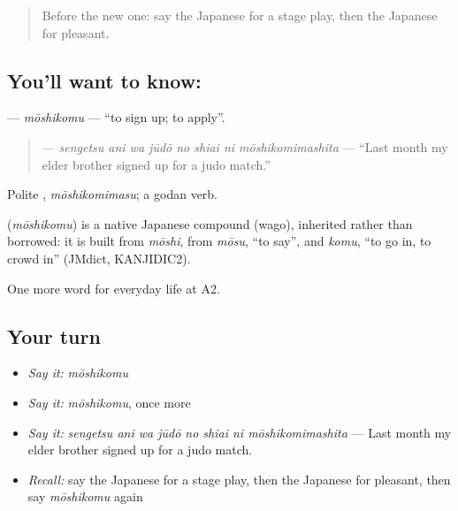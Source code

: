 \begin{quote}
Before the new one: say the Japanese for a stage play, then the Japanese for pleasant.
\end{quote}

\subsection*{You'll want to know: }
\textbf{} — \emph{mōshikomu} — \textquotedblleft{}to sign up; to apply\textquotedblright{}.

\begin{quote}
\textbf{    } — \emph{sengetsu ani wa jūdō no shiai ni mōshikomimashita} — \textquotedblleft{}Last month my elder brother signed up for a judo match.\textquotedblright{}
\end{quote}

Polite \textbf{}, \emph{mōshikomimasu}; a godan verb.

\begin{cousinweb}
\textbf{} (\emph{mōshikomu}) is a native Japanese compound (wago), inherited rather than borrowed: it is built from \emph{mōshi}, from \emph{mōsu}, \textquotedblleft{}to say\textquotedblright{}, and \emph{komu}, \textquotedblleft{}to go in, to crowd in\textquotedblright{} (JMdict, KANJIDIC2).
\end{cousinweb}

\begin{grammarlens}[title={What you've built}]
One more word for everyday life at A2.
\end{grammarlens}

\subsection*{Your turn}
\begin{itemize}
\raggedright
  \item \emph{Say it:} \emph{mōshikomu}
  \item \emph{Say it:} \emph{mōshikomu}, once more
  \item \emph{Say it:} \emph{sengetsu ani wa jūdō no shiai ni mōshikomimashita} — Last month my elder brother signed up for a judo match.
  \item \emph{Recall:} say the Japanese for a stage play, then the Japanese for pleasant, then say \emph{mōshikomu} again
\end{itemize}

